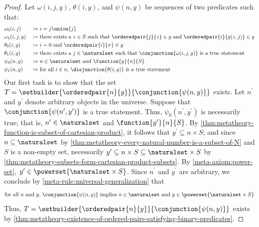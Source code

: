 \begin{proof}
    Let \( \omega(i, j, y) \), \( \theta(i, y) \), and \( \psi(n, y) \) be sequences of two predicates such that:
    \begin{alignat*}{2}
        &\omega_{0}(i, j) &&\coloneq i = j \union \mleft\{ j \mright\}\\
        &\omega_{1}(i, j, y) &&\coloneq \text{there exists a \( z \in S \) such that \( \orderedpair{j}{z} \in y \) and
        \( \orderedpair{i}{g(z, j)} \in y \)}\\
        &\theta_{0}(i, y) &&\coloneq i = 0 \ \text{and} \ \orderedpair{i}{\sigma} \in y\\
        &\theta_{1}(i, y) &&\coloneq \text{there exists a \( j \in \naturalset \) such that \( \conjunction{\omega(i, j, y)} \) is a true statement}\\
        &\psi_{0}(n, y) &&\coloneq n \in \naturalset \ \text{and} \ \function{y}{n}{S}\\
        &\psi_{1}(n, y) &&\coloneq \text{for all \( i \in n \), \( \disjunction{\theta(i, y)} \) is a true statement}
    \end{alignat*}
    Our first task is to show that the set \( T = \setbuilder{\orderedpair{n}{y}}{\conjunction{\psi(n, y)}} \) exists.
    Let \( n^{\prime} \) and \( y^{\prime} \) denote arbitrary objects in the universe.
    Suppose that \( \conjunction{\psi(n^{\prime}, y^{\prime})} \) is a true statement.
    Thus, \( \psi_{0}(n^{\prime}, y^{\prime}) \) is necessarily true; that is, \( n^{\prime} \in \naturalset \) and \( \function{y^{\prime}}{n}{S} \).
    By \cref{thm:metatheory-function-is-subset-of-cartesian-product}, it follows that \( y^{\prime} \subseteq n \times S \);
    and since \( n \subseteq \naturalset \) by \cref{thm:metatheory-every-natural-number-is-a-subset-of-N} and \( S \) is a non-empty set,
    necessarily \( y^{\prime} \subseteq  n \times S \subseteq \naturalset \times S \) by \cref{thm:metatheory-subsets-form-cartesian-product-subsets}.
    By \cref{meta-axiom:power-set}, \( y^{\prime} \in \powerset{\naturalset \times S} \).
    Since \( n^{\prime} \) and \( y^{\prime} \) are arbitrary, we conclude by \cref{meta-rule:universal-generalization} that
    \begin{equation*}
        \text{for all \( n \) and \( y \), \( \conjunction{\psi(n, y)} \) implies \( n \in \naturalset \) and \( y \in \powerset{\naturalset \times S} \)}
    \end{equation*}
    Thus, \( T = \setbuilder{\orderedpair{n}{y}}{\conjunction{\psi(n, y)}} \) exists by \cref{thm:metatheory-existence-of-ordered-pairs-satisfying-binary-predicates}.


\end{proof}
